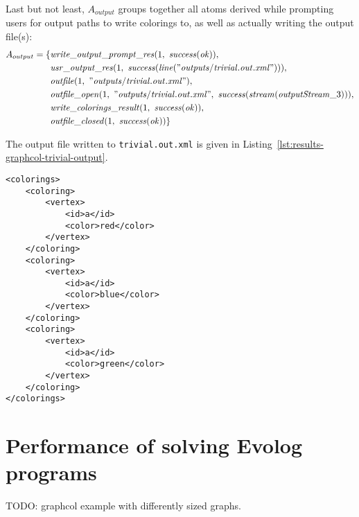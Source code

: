 \begin{example}
Last but not least, $A_{output}$ groups together all atoms derived while prompting users for output paths to write colorings to, as well as actually writing the output file(s):
\begin{align*}
    A_{output} = \{&\mathit{write\_output\_prompt\_res}(1,~\mathit{success}(\mathit{ok})),\\
                   &\mathit{usr\_output\_res}(1,~\mathit{success}(\mathit{line}(\mathit{"outputs/trivial.out.xml"}))),\\
                   &\mathit{outfile}(1,~\mathit{"outputs/trivial.out.xml"}),\\
                   &\mathit{outfile\_open}(1,~\mathit{"outputs/trivial.out.xml"},~\mathit{success}(\mathit{stream}(\mathit{outputStream}\_3))),\\
                   &\mathit{write\_colorings\_result}(1,~\mathit{success}(\mathit{ok})),\\
                   &\mathit{outfile\_closed}(1,~\mathit{success}(\mathit{ok}))\}
\end{align*}

The output file written to \texttt{trivial.out.xml} is given in Listing~\ref{lst:results-graphcol-trivial-output}.

\begin{lstlisting}[style=asp-code, label={lst:results-graphcol-trivial-output}, caption={XML encoding of caluclated colorings for the input file from Listing~\ref{lst:results-graphcol-trivial-input}}]
<colorings>
	<coloring>
		<vertex>
			<id>a</id>
			<color>red</color>
		</vertex>
	</coloring>
	<coloring>
		<vertex>
			<id>a</id>
			<color>blue</color>
		</vertex>
	</coloring>
	<coloring>
		<vertex>
			<id>a</id>
			<color>green</color>
		</vertex>
	</coloring>
</colorings>    
\end{lstlisting}
\end{example}
 

\section{Performance of solving Evolog programs}

TODO: graphcol example with differently sized graphs.